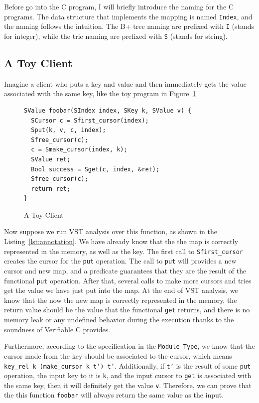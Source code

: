 \documentclass[runningheads]{llncs}
\begin{document}
Before go into the C program, I will briefly introduce the naming for the C
programs. The data structure that implements the mapping is named
\texttt{Index}, and the naming follows the intuition. The B+ tree naming are
prefixed with \texttt{I} (stands for integer), while the trie naming are
prefixed with \texttt{S} (stands for string). 

\subsection{A Toy Client}

Imagine a client who puts a key and value and then immediately gets the value
associated with the same key, like the toy program in Figure~\ref{fig:toy_client}

\begin{figure}[htbp]
  \centering
\begin{verbatim}
SValue foobar(SIndex index, SKey k, SValue v) {
  SCursor c = Sfirst_cursor(index);
  Sput(k, v, c, index);
  Sfree_cursor(c);
  c = Smake_cursor(index, k);
  SValue ret;
  Bool success = Sget(c, index, &ret);
  Sfree_cursor(c);
  return ret;
}
\end{verbatim}
  \caption{A Toy Client}\label{fig:toy_client}
\end{figure}

Now suppose we run VST analysis over this function, as shown in the
Listing~\ref{lst:annotation}. We have already know that the the map is
correctly represented in the memory, as well as the key. The first call to
\texttt{Sfirst\_cursor} creates the cursor for the \texttt{put} operation. The
call to \texttt{put} will provides a new cursor and new map, and a predicate
guarantees that they are the result of the functional \texttt{put} operation.
After that, several calls to make more cursors and tries get the value we
have just put into the map. At the end of VST analysis, we know that the now
the new map is correctly represented in the memory, the return value should be
the value that the functional \texttt{get} returns, and there is no memory leak
or any undefined behavior during the execution thanks to the soundness of
Verifiable C provides.

Furthermore, according to the specification in the \texttt{Module Type}, we know
that the cursor made from the key should be associated to the cursor, which
means \texttt{key\_rel k (make\_cursor k t') t'}. Additionally, if \texttt{t'} is
the result of some \texttt{put} operation, the input key to it is \texttt{k},
and the input cursor to \texttt{get} is associated with the same key, then it
will definitely get the value \texttt{v}. Therefore, we can prove that the this
function \texttt{foobar} will always return the same value as the input.
\end{document}
